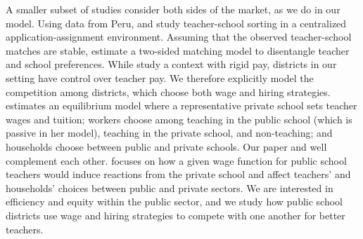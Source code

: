 \documentclass[notitlepage,12pt]{article}%
\begin{document}
A smaller subset of studies consider both sides of the market, as we do in our
model. Using data from Peru, \citet{bobba2021teacher} and
\citet{ederer2023labor} study teacher-school sorting in a centralized
application-assignment environment. Assuming that the observed teacher-school
matches are stable, \citet{boyd2013analyzing} estimate a two-sided matching
model to disentangle teacher and school preferences. While
\citet{boyd2013analyzing} study a context with rigid pay, districts in our
setting have control over teacher pay. We therefore explicitly model the
competition among districts, which choose both wage and hiring strategies.
\citet{tincani2020teacher} estimates an equilibrium model where a
representative private school sets teacher wages and tuition; workers choose
among teaching in the public school (which is passive in her model), teaching
in the private school, and non-teaching; and households choose between public
and private schools. Our paper and \citet{tincani2020teacher} well complement
each other. \citet{tincani2020teacher} focuses on how a given wage function
for public school teachers would induce reactions from the private school and
affect teachers' and households' choices between public and private sectors.
We are interested in efficiency and equity within the public sector, and we
study how public school districts use wage and hiring strategies to compete
with one another for better teachers.
\end{document}
